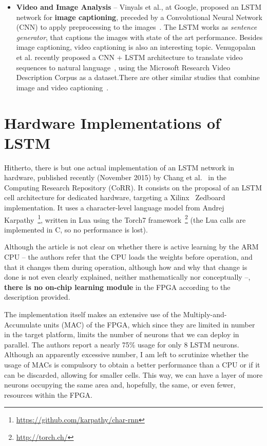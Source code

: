 \begin{itemize}
    \item \textbf{Video and Image Analysis} -- Vinyals et al., at Google, proposed an LSTM network for \textbf{image captioning}, preceded by a Convolutional Neural Network (CNN) to apply preprocessing to the images~\cite{Vinyals14}. The LSTM works as \emph{sentence generator}, that captions the images with state of the art performance. 
        Besides image captioning, video captioning is also an interesting topic. Venugopalan et al. recently proposed a CNN + LSTM architecture to translate video sequences to natural language~\cite{Donahue14}, using the Microsoft Research Video Description Corpus as a dataset.There are other similar studies that combine image and video captioning~\cite{Donahue14_2}.
\end{itemize}

\section{Hardware Implementations of LSTM}\label{sec:sa_hardware}
Hitherto, there is but one actual implementation of an LSTM network in hardware, published recently (November 2015) by Chang et al.~\cite{Chang15} in the Computing Research Repository (CoRR). It consists on the proposal of an LSTM cell architecture for dedicated hardware, targeting a Xilinx\textregistered~ Zedboard implementation. It uses a character-level language model from Andrej Karpathy~\footnote{\href{https://github.com/karpathy/char-rnn}{https://github.com/karpathy/char-rnn}}, written in Lua using the Torch7 framework~\footnote{\href{http://torch.ch/}{http://torch.ch/}} (the Lua calls are implemented in C, so no performance is lost).

Although the article is not clear on whether there is active learning by the ARM CPU -- the authors refer that the CPU loads the weights before operation, and that it changes them during operation, although how and why that change is done is not even clearly explained, neither mathematically nor conceptually --, \textbf{there is no on-chip learning module} in the FPGA according to the description provided. 

The implementation itself makes an extensive use of the Multiply-and-Accumulate units (MAC) of the FPGA, which since they are limited in number in the target platform, limits the number of neurons that we can deploy in parallel. The authors report a nearly 75\% usage for only 8 LSTM neurons. Although an apparently excessive number, I am left to scrutinize whether the usage of MACs is compulsory to obtain a better performance than a CPU or if it can be discarded, allowing for smaller cells. This way, we can have a layer of more neurons occupying the same area and, hopefully, the same, or even fewer, resources within the FPGA.

